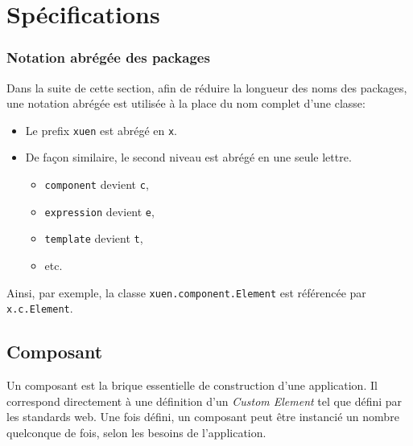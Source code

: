 \section{Spécifications} \label{sec:web-specs}

\subsubsection{Notation abrégée des packages}
Dans la suite de cette section, afin de réduire la longueur des noms des packages, une notation abrégée est utilisée à la place du nom complet d'une classe:
\begin{itemize}
	\item Le prefix \texttt{xuen} est abrégé en \texttt{x}.
	\item De façon similaire, le second niveau est abrégé en une seule lettre.
	\begin{itemize}
		\item \texttt{component} devient \texttt{c},
		\item \texttt{expression} devient \texttt{e},
		\item \texttt{template} devient \texttt{t},
		\item etc.
	\end{itemize}
\end{itemize}
Ainsi, par exemple, la classe \texttt{xuen.component.Element} est référencée par \texttt{x.c.Element}.

\subsection{Composant} \label{sec:web-usage-component}

Un composant est la brique essentielle de construction d'une application. Il correspond directement à une définition d'un \emph{Custom Element} tel que défini par les standards web. Une fois défini, un composant peut être instancié un nombre quelconque de fois, selon les besoins de l'application.

